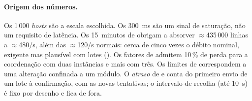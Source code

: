 \paragraph{Origem dos números.}
Os 1\,000 \emph{hosts} são a escala escolhida. Os 300~ms são um sinal de saturação, não um requisito de latência.
Os 15~minutos de  obrigam a absorver $\approx$435\,000 linhas a $\approx$480/s, além das $\approx$120/s
normais: cerca de cinco vezes o débito nominal, exigente mas plausível com lotes (). Os fatores de 
admitem 10\,\% de perda para a coordenação com duas instâncias e mais com três. Os limites de  correspondem
a uma alteração confinada a um módulo. O \emph{atraso} de  e  conta do primeiro envio de um lote à
confirmação, com as novas tentativas; o intervalo de recolha (até 10~s) é fixo por desenho e fica de fora.
